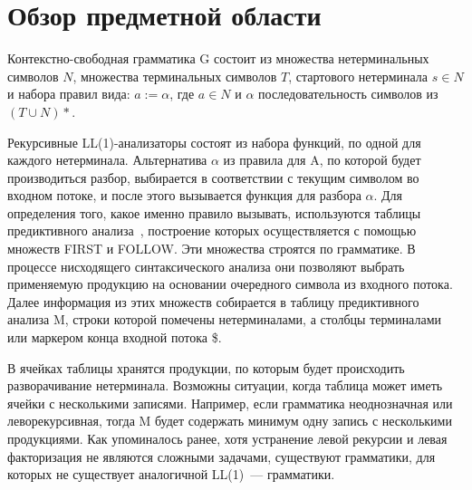 \section{Обзор предметной области}
Контекстно-свободная грамматика G состоит из множества нетерминальных символов $N$, множества терминальных символов $T$, стартового нетерминала $s \in N$  и набора правил вида:  $a := \alpha$, где $a \in N$ и $\alpha$ последовательность символов из  $(T \cup N)\ast$.

Рекурсивные LL(1)-анализаторы состоят из набора функций, по одной для каждого нетерминала. Альтернатива $\alpha$ из правила для A,  по которой будет производиться разбор, выбирается в соответствии с текущим символом во входном потоке,  и после этого вызывается функция для разбора $\alpha$. Для определения того, какое именно правило вызывать, используются таблицы предиктивного анализа~\cite{aho}, построение которых осуществляется с помощью множеств FIRST и FOLLOW. Эти множества строятся по грамматике. В процессе нисходящего синтаксического анализа они позволяют выбрать применяемую продукцию на основании очередного символа из входного потока. Далее информация из этих множеств собирается в таблицу предиктивного анализа M, строки которой помечены нетерминалами, а столбцы терминалами или маркером конца входной потока \$.

В ячейках таблицы хранятся продукции, по которым будет происходить разворачивание нетерминала. Возможны ситуации, когда таблица может иметь ячейки с несколькими записями. Например, если грамматика неоднозначная или леворекурсивная, тогда M будет содержать минимум одну запись с несколькими продукциями. Как упоминалось ранее, хотя устранение левой рекурсии и левая факторизация не являются сложными задачами, существуют  грамматики, для которых не существует аналогичной LL(1)~--- грамматики.

